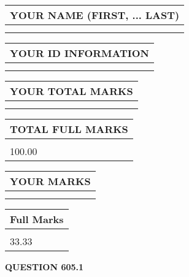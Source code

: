 \documentclass{ctexart}
\begin{document}
   
   
   
\newpage 
\setcounter{page}{ 
   605001 } 
   
   
   
   
\noindent\begin{tabular}{|l|}
\hline
YOUR NAME (FIRST, ... LAST)  \\
\hline
 \\ 
 \\ 
\hline
\end{tabular}
\hspace{0.05in} \begin{tabular}{|l|}
\hline
 YOUR   ID   INFORMATION  \\
\hline
 \\ 
 \\ 
\hline
\end{tabular}
   
   
\vspace{0.2in}\noindent\begin{tabular}{|l|}
\hline
YOUR TOTAL MARKS  \\
\hline
 \\ 
 \\ 
\hline
\end{tabular}
\hspace{0.05in} \begin{tabular}{|l|}
\hline
TOTAL FULL MARKS  \\
\hline
 \\ 
100.00 \\
\hline
\end{tabular}
   
   
 \vspace{0.2in}
 
 
 
 
   
   
  
\vspace{0.2in}
  
\noindent\begin{tabular}{|l|}
\hline
 YOUR MARKS  \\
\hline
 \\ 
 \\ 
\hline
\end{tabular}
\hspace{0.05in} \begin{tabular}{|l|}
\hline
 Full Marks  \\
\hline
 \\ 
33.33 \\
\hline
\end{tabular}
{\textbf{\Large{QUESTION
605.1 
}}}
  
\end{document}
